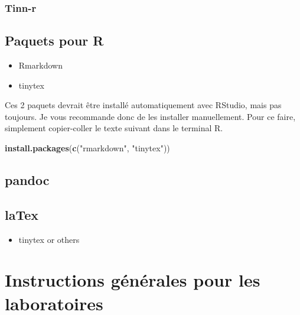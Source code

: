 \documentclass[
  12pt,
]{book}
\newenvironment{Shaded}{\begin{snugshade}}{\end{snugshade}}
\newcommand{\KeywordTok}[1]{\textcolor[rgb]{0.13,0.29,0.53}{\textbf{#1}}}
\newcommand{\NormalTok}[1]{#1}
\newcommand{\StringTok}[1]{\textcolor[rgb]{0.31,0.60,0.02}{#1}}
\providecommand{\tightlist}{%
  \setlength{\itemsep}{0pt}\setlength{\parskip}{0pt}}
\begin{document}
\hypertarget{tinn-r}{%
\subsubsection*{Tinn-r}\label{tinn-r}}

\hypertarget{paquets-pour-r}{%
\subsection*{Paquets pour R}\label{paquets-pour-r}}

\begin{itemize}
\tightlist
\item
  Rmarkdown
\item
  tinytex
\end{itemize}

Ces 2 paquets devrait être installé automatiquement avec RStudio, mais pas toujours. Je vous recommande donc de les installer manuellement. Pour ce faire, simplement copier-coller le texte suivant dans le terminal R.

\begin{Shaded}
\begin{Highlighting}[]
\KeywordTok{install.packages}\NormalTok{(}\KeywordTok{c}\NormalTok{(}\StringTok{"rmarkdown"}\NormalTok{, }\StringTok{"tinytex"}\NormalTok{))}
\end{Highlighting}
\end{Shaded}

\hypertarget{pandoc}{%
\subsection*{pandoc}\label{pandoc}}

\hypertarget{latex}{%
\subsection*{laTex}\label{latex}}

\begin{itemize}
\tightlist
\item
  tinytex
  or others
\end{itemize}

\hypertarget{instructions-guxe9nuxe9rales-pour-les-laboratoires}{%
\section*{Instructions générales pour les laboratoires}\label{instructions-guxe9nuxe9rales-pour-les-laboratoires}}
\end{document}
